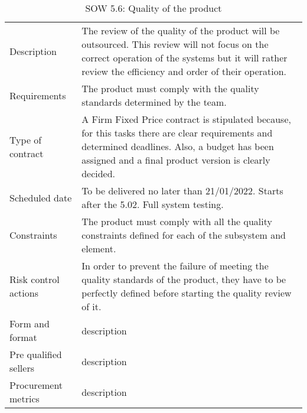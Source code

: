 \begin{table}[H]
	\centering
	\begin{tabular}
		{>{\raggedright\arraybackslash}p{3cm} >{\arraybackslash}p{11cm}}
		
		\toprule[2pt]
		
		\multicolumn{2}{c}{\textbf{SOW - 5.6. Quality of the product}}\\
		
		\midrule[1.5pt]
		
		Description & The review of the quality of the product will be outsourced. This review will not focus on the correct operation of the systems but it will rather review the efficiency and order of their operation. \\
		\hline
		
		Requirements & The product must comply with the quality standards determined by the team.\\
		\hline
		
		Type of contract & A Firm Fixed Price contract is stipulated because, for this tasks there are clear requirements and determined deadlines. Also, a budget has been assigned and a final product version is clearly decided.\\
		\hline
		
		Scheduled date & To be delivered no later than 21/01/2022. Starts after the 5.02. Full system testing.\\
		\hline
		
		Constraints & The product must comply with all the quality constraints defined for each of the subsystem and element.\\
		\hline
		
		Risk control actions & In order to prevent the failure of meeting the quality standards of the product, they have to be perfectly defined before starting the quality review of it.\\
		\hline
		
		Form and format & description\\
		\hline
		
		Pre qualified sellers & description\\
		\hline
		
		Procurement metrics & description\\
		
		\bottomrule[2pt]		
		
	\end{tabular}
	\caption{SOW 5.6: Quality of the product}
\end{table}

